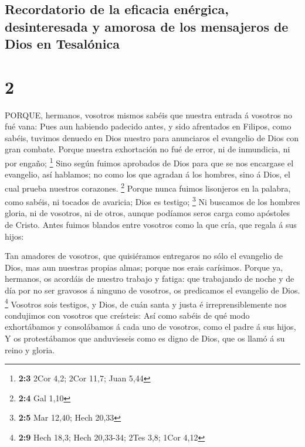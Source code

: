 \hypertarget{recordatorio-de-la-eficacia-enuxe9rgica-desinteresada-y-amorosa-de-los-mensajeros-de-dios-en-tesaluxf3nica}{%
\subsection{Recordatorio de la eficacia enérgica, desinteresada y
amorosa de los mensajeros de Dios en
Tesalónica}\label{recordatorio-de-la-eficacia-enuxe9rgica-desinteresada-y-amorosa-de-los-mensajeros-de-dios-en-tesaluxf3nica}}

\hypertarget{section-1}{%
\section{2}\label{section-1}}

 PORQUE, hermanos, vosotros mismos sabéis que nuestra
entrada á vosotros no fué vana:  Pues aun habiendo padecido
antes, y sido afrentados en Filipos, como sabéis, tuvimos denuedo en
Dios nuestro para anunciaros el evangelio de Dios con gran combate.
 Porque nuestra exhortación no fué de error, ni de
inmundicia, ni por engaño; \footnote{\textbf{2:3} 2Cor 4,2; 2Cor 11,7;
  Juan 5,44}  Sino según fuimos aprobados de Dios para que
se nos encargase el evangelio, así hablamos; no como los que agradan á
los hombres, sino á Dios, el cual prueba nuestros corazones. \footnote{\textbf{2:4}
  Gal 1,10}  Porque nunca fuimos lisonjeros en la palabra,
como sabéis, ni tocados de avaricia; Dios es testigo; \footnote{\textbf{2:5}
  Mar 12,40; Hech 20,33}  Ni buscamos de los hombres gloria,
ni de vosotros, ni de otros, aunque podíamos seros carga como apóstoles
de Cristo.  Antes fuimos blandos entre vosotros como la que
cría, que regala á sus hijos:

 Tan amadores de vosotros, que quisiéramos entregaros no
sólo el evangelio de Dios, mas aun nuestras propias almas; porque nos
erais carísimos.  Porque ya, hermanos, os acordáis de
nuestro trabajo y fatiga: que trabajando de noche y de día por no ser
gravosos á ninguno de vosotros, os predicamos el evangelio de Dios.
\footnote{\textbf{2:9} Hech 18,3; Hech 20,33-34; 2Tes 3,8; 1Cor 4,12}
 Vosotros sois testigos, y Dios, de cuán santa y justa é
irreprensiblemente nos condujimos con vosotros que creísteis:
 Así como sabéis de qué modo exhortábamos y consolábamos á
cada uno de vosotros, como el padre á sus hijos,  Y os
protestábamos que anduvieseis como es digno de Dios, que os llamó á su
reino y gloria.

